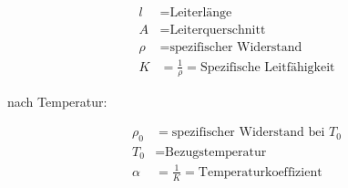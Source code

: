         \vspace{-1mm}
        \begin{minipage}{0.49\linewidth}
            \begin{footnotesize}
                \begin{center}
                \end{center}
            \end{footnotesize}
        \end{minipage}
        \begin{minipage}{0.5\linewidth}
            \begin{scriptsize}
                \begin{center}
                    \begin{align*}
                        l &= \text{Leiterlänge}
                        \\A &= \text{Leiterquerschnitt} 
                        \\\rho &= \text{spezifischer Widerstand}
                        \\  K &= \frac{1}{\rho} = \text{Spezifische Leitfähigkeit}
                    \end{align*}
                \end{center}
            \end{scriptsize}
        \end{minipage}
        \vspace{1mm}

        nach Temperatur:

        \vspace{-1mm}
        \begin{minipage}{0.49\linewidth}
            \begin{footnotesize}
                \begin{center}
                \end{center}
            \end{footnotesize}
        \end{minipage}
        \begin{minipage}{0.5\linewidth}
            \begin{scriptsize}
                \begin{center}
                    \begin{align*}
                        \rho_0 &= \text{spezifischer Widerstand bei } T_0
                        \\T_0 &= \text{Bezugstemperatur}
                        \\\alpha &= \frac{1}{K} =\text{Temperaturkoeffizient}
                    \end{align*}
                \end{center}
            \end{scriptsize}
        \end{minipage}
        \vspace{1mm}